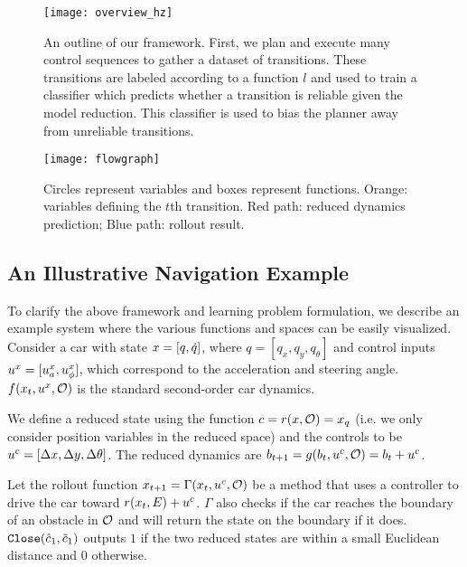 \begin{figure}[t]
    \centering
    \texttt{[image: overview\_hz]}
    \caption{An outline of our framework. First, we plan and execute many control sequences to gather a dataset of transitions. These transitions are labeled according to a function $l$ and used to train a classifier which predicts whether a transition is reliable given the model reduction. This classifier is used to bias the planner away from unreliable transitions.}
    \label{fig:overview}
    \vspace{0.1in}
    \centering
    \texttt{[image: flowgraph]}
    \vspace{-0.1in}
    \caption{Circles represent variables and boxes represent functions. Orange: variables defining the $t$th transition. Red path: reduced dynamics prediction; Blue path: rollout result.}
    \vspace{-0.1in}
    \label{fig:flowgraph}
\end{figure}


\subsection{An Illustrative Navigation Example}

\label{sec:car_example}
To clarify the above framework and learning problem formulation, we describe an example system where the various functions and spaces can be easily visualized. Consider a car with state $x = [q,\dot{q}]$, where $q = [q_x,q_y,q_\theta]$ and control inputs $u^{x} = [u^{x}_a,u^{x}_\phi]$, which correspond to the acceleration and steering angle. $f(x_t,u^x,\mathcal{O})$ is the standard second-order car dynamics. 

We define a reduced state using the function $c = r(x,\mathcal{O}) = x_q$ (i.e. we only consider position variables in the reduced space) and the controls to be $u^c = [\Delta x,\Delta y, \Delta \theta ]$. The reduced dynamics are $b_{t+1} = g(b_t,u^c,\mathcal{O}) = b_t + u^c$.

Let the rollout function $x_{t+1} = \Gamma(x_t,u^c,\mathcal{O})$ be a method that uses a controller to drive the car toward $r(x_t,E) + u^c$. $\Gamma$ also checks if the car reaches the boundary of an obstacle in $\mathcal{O}$ and will return the state on the boundary if it does. $\texttt{Close}(\hat{c}_1,\tilde{c}_1)$ outputs $1$ if the two reduced states are within a small Euclidean distance and $0$ otherwise. 

